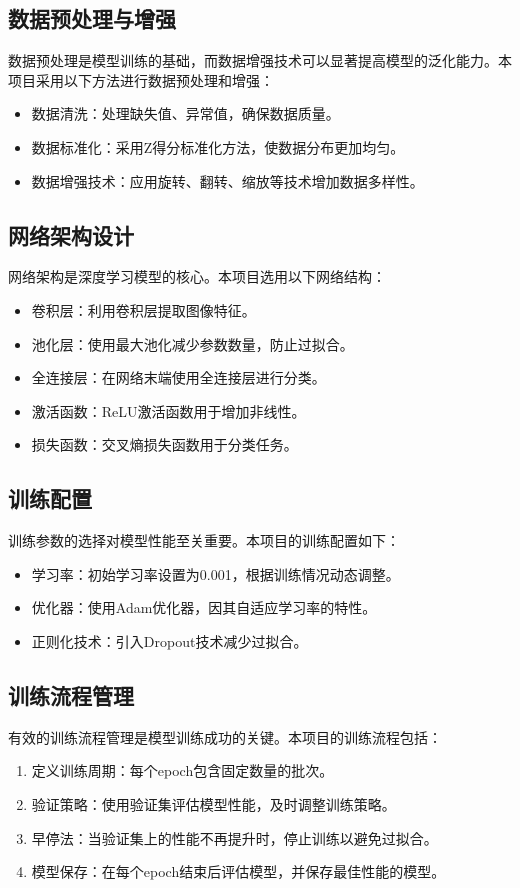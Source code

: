 \documentclass{xdutlabreport}
\begin{document}
\subsection{数据预处理与增强}
数据预处理是模型训练的基础，而数据增强技术可以显著提高模型的泛化能力。本项目采用以下方法进行数据预处理和增强：
\begin{itemize}
    \item 数据清洗：处理缺失值、异常值，确保数据质量。
    \item 数据标准化：采用Z得分标准化方法，使数据分布更加均匀。
    \item 数据增强技术：应用旋转、翻转、缩放等技术增加数据多样性。
\end{itemize}

\subsection{网络架构设计}
网络架构是深度学习模型的核心。本项目选用以下网络结构：
\begin{itemize}
    \item 卷积层：利用卷积层提取图像特征。
    \item 池化层：使用最大池化减少参数数量，防止过拟合。
    \item 全连接层：在网络末端使用全连接层进行分类。
    \item 激活函数：ReLU激活函数用于增加非线性。
    \item 损失函数：交叉熵损失函数用于分类任务。
\end{itemize}

\subsection{训练配置}
训练参数的选择对模型性能至关重要。本项目的训练配置如下：
\begin{itemize}
    \item 学习率：初始学习率设置为0.001，根据训练情况动态调整。
    \item 优化器：使用Adam优化器，因其自适应学习率的特性。
    \item 正则化技术：引入Dropout技术减少过拟合。
\end{itemize}

\subsection{训练流程管理}
有效的训练流程管理是模型训练成功的关键。本项目的训练流程包括：
\begin{enumerate}
    \item 定义训练周期：每个epoch包含固定数量的批次。
    \item 验证策略：使用验证集评估模型性能，及时调整训练策略。
    \item 早停法：当验证集上的性能不再提升时，停止训练以避免过拟合。
    \item 模型保存：在每个epoch结束后评估模型，并保存最佳性能的模型。
\end{enumerate}
\end{document}

